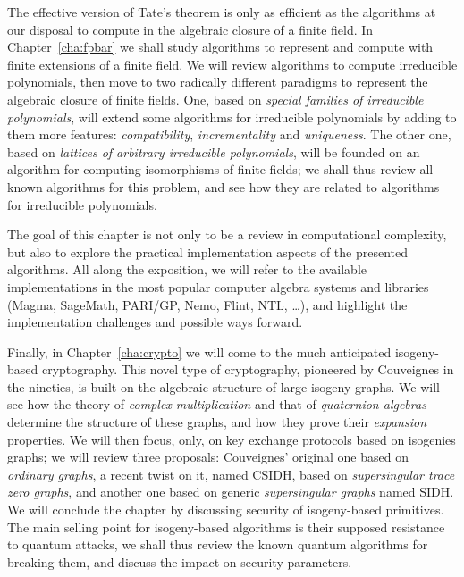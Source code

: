 \documentclass{report}
\theoremstyle{plain}
\theoremstyle{definition}
\begin{document}
The effective version of Tate's theorem is only as efficient as the
algorithms at our disposal to compute in the algebraic closure of a
finite field. %
In Chapter~\ref{cha:fpbar} we shall study algorithms to represent and
compute with finite extensions of a finite field. %
We will review algorithms to compute irreducible polynomials, then
move to two radically different paradigms to represent the algebraic
closure of finite fields. %
One, based on \emph{special families of irreducible polynomials}, will
extend some algorithms for irreducible polynomials by adding to them
more features: \emph{compatibility}, \emph{incrementality} and
\emph{uniqueness}. %
The other one, based on \emph{lattices of arbitrary irreducible
  polynomials}, will be founded on an algorithm for computing
isomorphisms of finite fields; we shall thus review all known
algorithms for this problem, and see how they are related to
algorithms for irreducible polynomials. %

The goal of this chapter is not only to be a review in computational
complexity, but also to explore the practical implementation aspects
of the presented algorithms. %
All along the exposition, we will refer to the available
implementations in the most popular computer algebra systems and
libraries (Magma, SageMath, PARI/GP, Nemo, Flint, NTL, \dots), and
highlight the implementation challenges and possible ways forward. %

Finally, in Chapter~\ref{cha:crypto} we will come to the much
anticipated isogeny-based cryptography. %
This novel type of cryptography, pioneered by Couveignes in the
nineties, is built on the algebraic structure of large isogeny
graphs. %
We will see how the theory of \emph{complex multiplication} and that
of \emph{quaternion algebras} determine the structure of these graphs,
and how they prove their \emph{expansion} properties. %
We will then focus, only, on key exchange protocols based on isogenies
graphs; we will review three proposals: Couveignes' original one based
on \emph{ordinary graphs}, a recent twist on it, named CSIDH, based on
\emph{supersingular trace zero graphs}, and another one based on
generic \emph{supersingular graphs} named SIDH. %
We will conclude the chapter by discussing security of isogeny-based
primitives. %
The main selling point for isogeny-based algorithms is their supposed
resistance to quantum attacks, we shall thus review the known quantum
algorithms for breaking them, and discuss the impact on security
parameters. %
\end{document}

